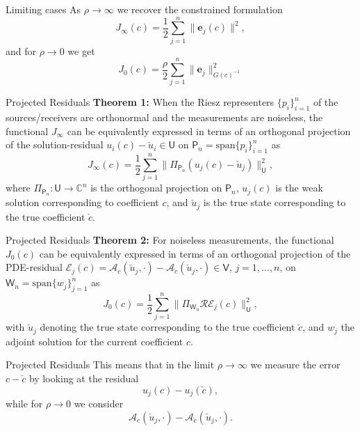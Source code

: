 \documentclass{beamer}
\newcommand{\sU}{\mathsf{U}}
\begin{document}
\begin{frame}{Limiting cases}
As $\rho\rightarrow\infty$ we recover the constrained formulation
\begin{equation*}
J_\infty(c) = \frac{1}{2} \sum_{j=1}^n \|\mathbf{e}_j(c)\|^2,
\end{equation*}
and for $\rho\rightarrow 0$ we get
\begin{equation*}
J_0(c) = \frac{\rho}{2} \sum_{j=1}^n \|\mathbf{e}_j\|_{G(c)^{-1}}^2
\end{equation*}
\end{frame}

\begin{frame}{Projected Residuals}
\textbf{Theorem 1: }
When the Riesz representers $\{p_i\}_{i=1}^n$ of the sources/receivers are orthonormal and the measurements are noiseless, the functional $J_\infty$ can be equivalently expressed in terms of an orthogonal projection of the solution-residual $u_i(c) - \check{u}_i \in \mathsf{U}$ on $\mathsf{P}_n = \text{span}\{p_i\}_{i=1}^n$ as
\[
J_{\infty}(c) = {\textstyle\frac{1}{2}}\sum_{j=1}^n\|\Pi_{\mathsf{P}_n}(u_j(c) - \check{u}_j)\|_{\mathsf{U}}^2,
\]
where $\Pi_{\mathsf{P}_n}:\sU\rightarrow\mathbb{C}^n$ is the orthogonal projection on $\mathsf{P}_n$, $u_j(c)$ is the weak solution corresponding to coefficient $c$, and $\check{u}_j$ is the true state corresponding to the true coefficient $\check{c}$.

\end{frame}

\begin{frame}{Projected Residuals}
\textbf{Theorem 2: }
For noiseless measurements, the functional $J_0(c)$ can be equivalently expressed in terms of an orthogonal projection of the PDE-residual $\mathcal{E}_j(c) = \mathcal{A}_c(\check{u}_j,\cdot) -  \mathcal{A}_{\check{c}}(\check{u}_j,\cdot) \in \mathsf{V}$, $j=1,\ldots,n$, on $\mathsf{W}_n = \text{span}\{w_j\}_{j=1}^n$ as
\[
J_0(c) = {\textstyle\frac{1}{2}}\sum_{j=1}^n \|\Pi_{\mathsf{W}_n}\mathcal{R}\mathcal{E}_j(c)\|_{\mathsf{U}}^2,
\]
with $\check{u}_j$ denoting the true state corresponding to the true coefficient $\check{c}$, and $w_j$ the adjoint solution for the current coefficient $c$.
\end{frame}


\begin{frame}{Projected Residuals}
This means that in the limit $\rho\rightarrow\infty$ we measure the error $c-\check{c}$ by looking at the residual
\[
u_j(c) - u_j(\check{c}),
\]
while for $\rho\rightarrow 0$ we consider
\[
\mathcal{A}_c(\check{u}_j,\cdot) -  \mathcal{A}_{\check{c}}(\check{u}_j,\cdot). 
\]
\end{frame}
\end{document}
